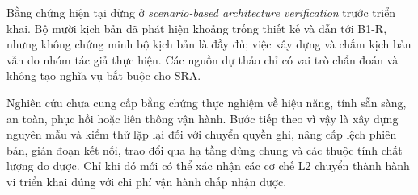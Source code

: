 Bằng chứng hiện tại dừng ở \emph{scenario-based architecture verification} trước triển khai. Bộ mười kịch bản đã phát hiện khoảng trống thiết kế và dẫn tới B1-R, nhưng không chứng minh bộ kịch bản là đầy đủ; việc xây dựng và chấm kịch bản vẫn do nhóm tác giả thực hiện. Các nguồn dự thảo chỉ có vai trò chẩn đoán và không tạo nghĩa vụ bắt buộc cho SRA.

Nghiên cứu chưa cung cấp bằng chứng thực nghiệm về hiệu năng, tính sẵn sàng, an toàn, phục hồi hoặc liên thông vận hành. Bước tiếp theo vì vậy là xây dựng nguyên mẫu và kiểm thử lặp lại đối với chuyển quyền ghi, nâng cấp lệch phiên bản, gián đoạn kết nối, trao đổi qua hạ tầng dùng chung và các thuộc tính chất lượng đo được. Chỉ khi đó mới có thể xác nhận các cơ chế L2 chuyển thành hành vi triển khai đúng với chi phí vận hành chấp nhận được.
